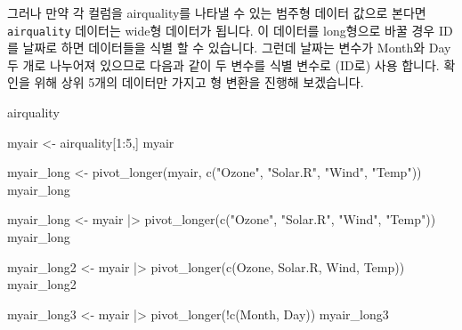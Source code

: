 \documentclass[
  a4paper,
]{book}
\newenvironment{Shaded}{\begin{snugshade}}{\end{snugshade}}
\newcommand{\AttributeTok}[1]{\textcolor[rgb]{0.40,0.45,0.13}{#1}}
\newcommand{\DecValTok}[1]{\textcolor[rgb]{0.68,0.00,0.00}{#1}}
\newcommand{\FunctionTok}[1]{\textcolor[rgb]{0.28,0.35,0.67}{#1}}
\newcommand{\NormalTok}[1]{\textcolor[rgb]{0.00,0.23,0.31}{#1}}
\newcommand{\OtherTok}[1]{\textcolor[rgb]{0.00,0.23,0.31}{#1}}
\newcommand{\SpecialCharTok}[1]{\textcolor[rgb]{0.37,0.37,0.37}{#1}}
\newcommand{\StringTok}[1]{\textcolor[rgb]{0.13,0.47,0.30}{#1}}
\begin{document}
\begin{Shaded}
\end{Shaded}

그러나 만약 각 컬럼을 airquality를 나타낼 수 있는 범주형 데이터 값으로
본다면 \texttt{airquality} 데이터는 wide형 데이터가 됩니다. 이 데이터를
long형으로 바꿀 경우 ID를 날짜로 하면 데이터들을 식별 할 수 있습니다.
그런데 날짜는 변수가 Month와 Day두 개로 나누어져 있으므로 다음과 같이 두
변수를 식별 변수로 (ID로) 사용 합니다. 확인을 위해 상위 5개의 데이터만
가지고 형 변환을 진행해 보겠습니다.

\begin{Shaded}
\begin{Highlighting}[]
\NormalTok{airquality}

\NormalTok{myair }\OtherTok{\textless{}{-}}\NormalTok{ airquality[}\DecValTok{1}\SpecialCharTok{:}\DecValTok{5}\NormalTok{,]}
\NormalTok{myair}

\NormalTok{myair\_long }\OtherTok{\textless{}{-}} \FunctionTok{pivot\_longer}\NormalTok{(myair, }\FunctionTok{c}\NormalTok{(}\StringTok{"Ozone"}\NormalTok{, }\StringTok{"Solar.R"}\NormalTok{, }\StringTok{"Wind"}\NormalTok{, }\StringTok{"Temp"}\NormalTok{))}
\NormalTok{myair\_long }

\NormalTok{myair\_long }\OtherTok{\textless{}{-}}\NormalTok{ myair }\SpecialCharTok{|\textgreater{}} 
  \FunctionTok{pivot\_longer}\NormalTok{(}\FunctionTok{c}\NormalTok{(}\StringTok{"Ozone"}\NormalTok{, }\StringTok{"Solar.R"}\NormalTok{, }\StringTok{"Wind"}\NormalTok{, }\StringTok{"Temp"}\NormalTok{))}
\NormalTok{myair\_long }

\NormalTok{myair\_long2 }\OtherTok{\textless{}{-}}\NormalTok{ myair }\SpecialCharTok{|\textgreater{}} 
  \FunctionTok{pivot\_longer}\NormalTok{(}\FunctionTok{c}\NormalTok{(Ozone, Solar.R, Wind, Temp))}
\NormalTok{myair\_long2 }

\NormalTok{myair\_long3 }\OtherTok{\textless{}{-}}\NormalTok{ myair }\SpecialCharTok{|\textgreater{}} 
  \FunctionTok{pivot\_longer}\NormalTok{(}\SpecialCharTok{!}\FunctionTok{c}\NormalTok{(Month, Day))}
\NormalTok{myair\_long3}
\end{Highlighting}
\end{Shaded}
\end{document}
